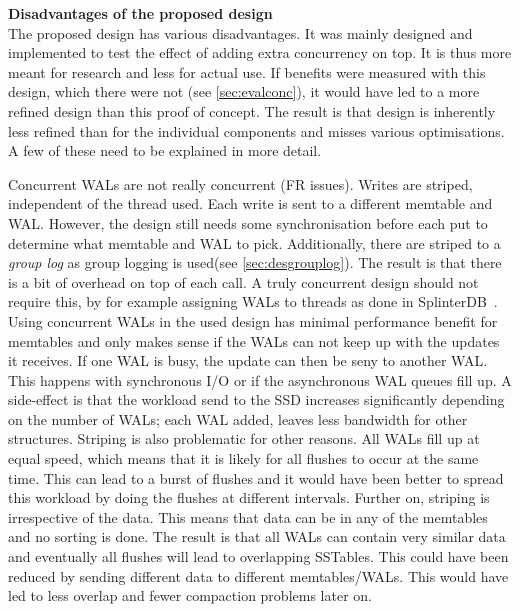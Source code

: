 \textbf{Disadvantages of the proposed design}\\
The proposed design has various disadvantages. It was mainly designed and implemented to test the effect of adding extra concurrency on top. It is thus more meant for research and less for actual use. If benefits were measured with this design, which there were not (see \autoref{sec:evalconc}), it would have led to a more refined design than this proof of concept. The result is that design is inherently less refined than for the individual components and misses various optimisations. A few of these need to be explained in more detail.

Concurrent WALs are not really concurrent (FR issues). Writes are striped, independent of the thread used. Each write is sent to a different memtable and WAL. However, the design still needs some synchronisation before each put to determine what memtable and WAL to pick. Additionally, there are striped to a \textit{group log} as group logging is used(see \autoref{sec:desgrouplog}). The result is that there is a bit of overhead on top of each call. A truly concurrent design should not require this, by for example assigning WALs to threads as done in SplinterDB~\cite{conway2020splinterdb}. Using concurrent WALs in the used design has minimal performance benefit for memtables and only makes sense if the WALs can not keep up with the updates it receives. If one WAL is busy, the update can then be seny to another WAL. This happens with synchronous I/O or if the asynchronous WAL queues fill up. A side-effect is that the workload send to the SSD increases significantly depending on the number of WALs; each WAL added, leaves less bandwidth for other structures.  
Striping is also problematic for other reasons. All WALs fill up at equal speed, which means that it is likely for all flushes to occur at the same time. This can lead to a burst of flushes and it would have been better to spread this workload by doing the flushes at different intervals. Further on, striping is irrespective of the data. This means that data can be in any of the memtables and no sorting is done. The result is that all WALs can contain very similar data and eventually all flushes will lead to overlapping SSTables. This could have been reduced by sending different data to different memtables/WALs. This would have led to less overlap and fewer compaction problems later on.

